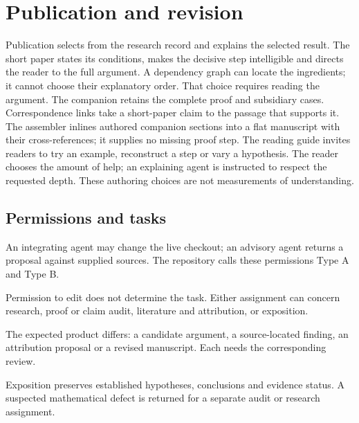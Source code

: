 \documentclass[10pt]{article}
\begin{document}
\section{Publication and revision}\label{sec:paper}\label{sec:short}\label{sec:long}\label{sec:production}
Publication selects from the research record and explains the selected result. The short paper states its conditions, makes the decisive step intelligible and directs the reader to the full argument.
A dependency graph can locate the ingredients; it cannot choose their explanatory order. That choice requires reading the argument.
The companion retains the complete proof and subsidiary cases. Correspondence links take a short-paper claim to the passage that supports it.
The assembler inlines authored companion sections into a flat manuscript with their cross-references; it supplies no missing proof step.
The reading guide invites readers to try an example, reconstruct a step or vary a hypothesis. The reader chooses the amount of help; an explaining agent is instructed to respect the requested depth. These authoring choices are not measurements of understanding.

\subsection{Permissions and tasks}

An integrating agent may change the live checkout; an advisory agent returns a proposal against supplied sources. The repository calls these permissions Type A and Type B.

Permission to edit does not determine the task. Either assignment can concern research, proof or claim audit, literature and attribution, or exposition.

The expected product differs: a candidate argument, a source-located finding, an attribution proposal or a revised manuscript. Each needs the corresponding review.

Exposition preserves established hypotheses, conclusions and evidence status. A suspected mathematical defect is returned for a separate audit or research assignment.
\end{document}
